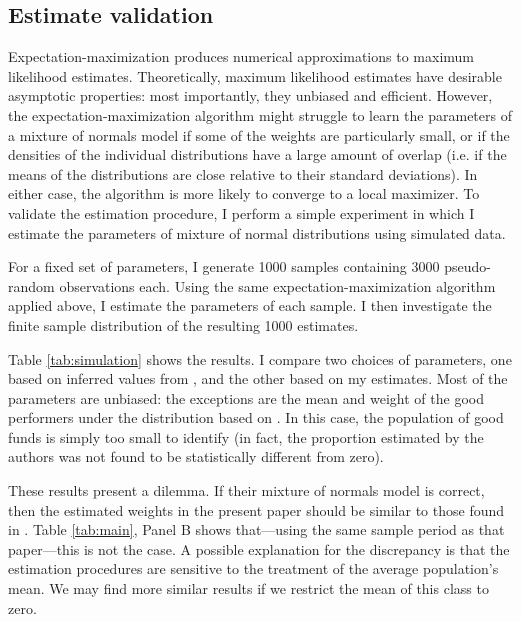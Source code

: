 	\subsection{Estimate validation}
		Expectation-maximization produces numerical approximations to maximum likelihood estimates. Theoretically, maximum likelihood estimates have desirable asymptotic properties: most importantly, they unbiased and efficient.  However, the expectation-maximization algorithm might struggle to learn the parameters of a mixture of normals model if some of the weights are particularly small, or if the densities of the individual distributions have a large amount of overlap (i.e. if the means of the distributions are close relative to their standard deviations). In either case, the algorithm is more likely to converge to a local maximizer. To validate the estimation procedure, I perform a simple experiment in which I estimate the parameters of mixture of normal distributions using simulated data.

		For a fixed set of parameters, I generate 1000 samples containing 3000 pseudo-random observations each. Using the same expectation-maximization algorithm applied above, I estimate the parameters of each sample. I then investigate the finite sample distribution of the resulting 1000 estimates.

		Table \ref{tab:simulation} shows the results. I compare two choices of parameters, one based on inferred values from \citet{Barras2010}, and the other based on my estimates. Most of the parameters are unbiased: the exceptions are the mean and weight of the good performers under the distribution based on \citet{Barras2010}.  In this case, the population of good funds is simply too small to identify (in fact, the proportion estimated by the authors was not found to be statistically different from zero).

		These results present a dilemma. If their mixture of normals model is correct, then the estimated weights in the present paper should be similar to those found in \citet{Barras2010}. Table \ref{tab:main}, Panel B shows that---using the same sample period as that paper---this is not the case.  A possible explanation for the discrepancy is that the estimation procedures are sensitive to the treatment of the average population's mean.  We may find more similar results if we restrict the mean of this class to zero.

